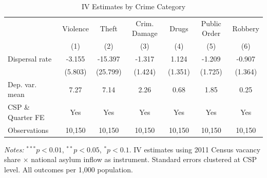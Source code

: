 \begin{table}[t]
\centering
\caption{IV Estimates by Crime Category}
\label{tab:categories}
\small
\begin{tabular}{lcccccc}
\hline\hline
 & Violence & Theft & Crim. Damage & Drugs & Public Order & Robbery \\
 & (1) & (2) & (3) & (4) & (5) & (6) \\
\hline
Dispersal rate & -3.155 & -15.397 & -1.317 & 1.124 & -1.209 & -0.907 \\
 & (5.803) & (25.799) & (1.424) & (1.351) & (1.725) & (1.364) \\
\hline
Dep. var. mean & 7.27 & 7.14 & 2.26 & 0.68 & 1.85 & 0.25 \\
CSP \& Quarter FE & Yes & Yes & Yes & Yes & Yes & Yes \\
Observations & 10,150 & 10,150 & 10,150 & 10,150 & 10,150 & 10,150 \\
\hline\hline
\end{tabular}
\begin{tablenotes}\small
\item \textit{Notes:} $^{***}p<0.01$, $^{**}p<0.05$, $^{*}p<0.1$. IV estimates using 2011 Census vacancy share $\times$ national asylum inflow as instrument. Standard errors clustered at CSP level. All outcomes per 1,000 population.
\end{tablenotes}
\end{table}

